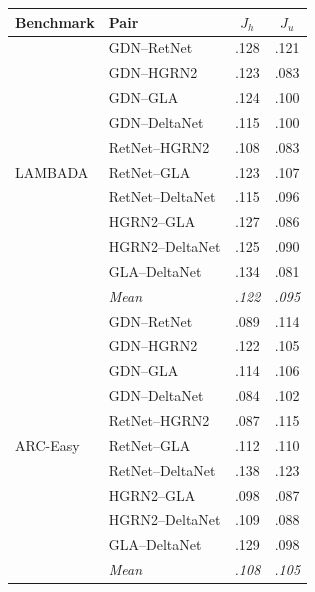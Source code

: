 \begin{center}
\small
{}
\label{tab:extended_arch_jaccard}
\begin{tabular}{@{}llcc@{}}
\toprule
Benchmark & Pair & $J_h$ & $J_u$ \\
\midrule
\multirow{11}{*}{LAMBADA} & GDN--RetNet & .128 & .121 \\
 & GDN--HGRN2 & .123 & .083 \\
 & GDN--GLA & .124 & .100 \\
 & GDN--DeltaNet & .115 & .100 \\
 & RetNet--HGRN2 & .108 & .083 \\
 & RetNet--GLA & .123 & .107 \\
 & RetNet--DeltaNet & .115 & .096 \\
 & HGRN2--GLA & .127 & .086 \\
 & HGRN2--DeltaNet & .125 & .090 \\
 & GLA--DeltaNet & .134 & .081 \\
 & \textit{Mean} & \textit{.122} & \textit{.095} \\
\midrule
\multirow{11}{*}{ARC-Easy} & GDN--RetNet & .089 & .114 \\
 & GDN--HGRN2 & .122 & .105 \\
 & GDN--GLA & .114 & .106 \\
 & GDN--DeltaNet & .084 & .102 \\
 & RetNet--HGRN2 & .087 & .115 \\
 & RetNet--GLA & .112 & .110 \\
 & RetNet--DeltaNet & .138 & .123 \\
 & HGRN2--GLA & .098 & .087 \\
 & HGRN2--DeltaNet & .109 & .088 \\
 & GLA--DeltaNet & .129 & .098 \\
 & \textit{Mean} & \textit{.108} & \textit{.105} \\
\bottomrule
\end{tabular}
\end{center}


